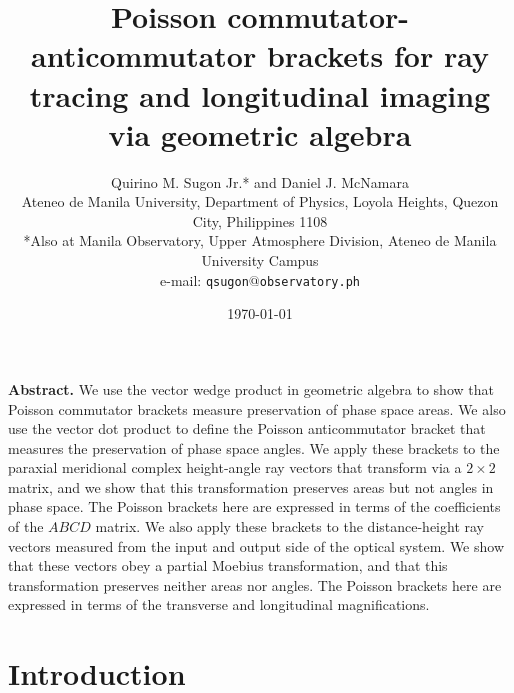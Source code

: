 \documentclass[11pt,twocolumn]{article}
\begin{document}
\title{\textsf{\textbf{Poisson commutator-anticommutator brackets for ray tracing and longitudinal imaging via geometric algebra}}}
\author{Quirino M. Sugon Jr.* and Daniel J. McNamara
\smallskip\\
\small{Ateneo de Manila University, Department of Physics, Loyola Heights, Quezon City, Philippines 1108}\\
\small{*Also at Manila Observatory, Upper Atmosphere Division, Ateneo de Manila University Campus}\\
\small{e-mail: \texttt{qsugon$@$observatory.ph}}}
\date{\small{\today}}
\maketitle

\small
\section*{}\label{Abstract}
\textbf{Abstract.}  
We use the vector wedge product in geometric algebra to show that Poisson commutator brackets measure preservation of phase space areas.  We also use the vector dot product to define the Poisson anticommutator bracket that measures the preservation of phase space angles.  We apply these brackets to the paraxial meridional complex height-angle ray vectors that transform via a $2\times 2$ matrix, and we show that this transformation preserves areas but not angles in phase space.  The Poisson brackets here are expressed in terms of the coefficients of the $ABCD$ matrix.  We also apply these brackets to the distance-height ray vectors measured from the input and output side of the optical system.  We show that these vectors obey a partial Moebius transformation, and that this transformation preserves neither areas nor angles.  The Poisson brackets here are expressed in terms of the transverse and longitudinal magnifications.     

\section{Introduction}
\end{document}
